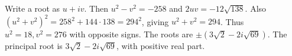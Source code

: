 Write a root as $u+iv$. Then $u^2-v^2=-258$ and $2uv=-12\sqrt{138}$. Also $(u^2+v^2)^2=258^2+144\cdot138=294^2$, giving $u^2+v^2=294$. Thus $u^2=18,v^2=276$ with opposite signs. The roots are $\boxed{\pm(3\sqrt2-2i\sqrt{69})}$. The principal root is $3\sqrt2-2i\sqrt{69}$, with positive real part.
